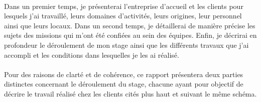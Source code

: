 \paragraph{}
Dans un premier temps, je présenterai l'entreprise d'accueil et les clients pour lesquels j'ai travaillé, leurs domaines d’activités, leurs origines, leur personnel ainsi que leurs locaux.
Dans un second temps, je détaillerai de manière précise les sujets des missions qui m’ont été confiées au sein des équipes.
Enfin, je décrirai en profondeur le déroulement de mon stage ainsi que les différents travaux que j’ai accompli et les conditions dans lesquelles je les ai réalisé. 

\paragraph{}
Pour des raisons de clarté et de cohérence, ce rapport présentera deux parties distinctes concernant le déroulement du stage, chacune ayant pour objectif de décrire le travail réalisé chez les clients cités plus haut et suivant le même schéma.